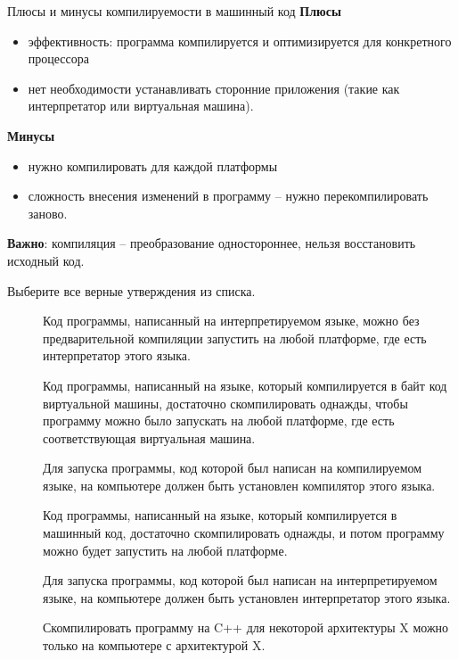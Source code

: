 \documentclass[
    9pt,
    hyperref={pdfencoding=unicode}
    ]{beamer}
\begin{document}
\begin{frame}{Плюсы и минусы компилируемости в машинный код}
    \textbf{Плюсы}
    \begin{itemize}
        \item эффективность: программа компилируется и оптимизируется для конкретного процессора
        \item нет необходимости устанавливать сторонние приложения (такие как интерпретатор или виртуальная машина).
    \end{itemize}
    \textbf{Минусы}
    \begin{itemize}
        \item нужно компилировать для каждой платформы
        \item сложность внесения изменений в программу -- нужно перекомпилировать заново.
    \end{itemize}
    \textbf{Важно}: компиляция -- преобразование одностороннее, нельзя восстановить исходный код.
\end{frame}

\begin{frame}
    Выберите все верные утверждения из списка.
    \begin{description}
        \item[\Square]  Код программы, написанный на интерпретируемом языке, можно без предварительной компиляции запустить на любой платформе, где есть интерпретатор этого языка.
        \item[\Square]  Код программы, написанный на языке, который компилируется в байт код виртуальной машины, достаточно скомпилировать однажды, чтобы программу можно было запускать на любой платформе, где есть соответствующая виртуальная машина.
        \item[\Square]  Для запуска программы, код которой был написан на компилируемом языке, на компьютере должен быть установлен компилятор этого языка.
        \item[\Square]  Код программы, написанный на языке, который компилируется в машинный код, достаточно скомпилировать однажды, и потом программу можно будет запустить на любой платформе.
        \item[\Square] Для запуска программы, код которой был написан на интерпретируемом языке, на компьютере должен быть установлен интерпретатор этого языка.
        \item[\Square] Скомпилировать программу на C++ для некоторой архитектуры X можно только на компьютере с архитектурой X.
    \end{description}
\end{frame}
\end{document}
